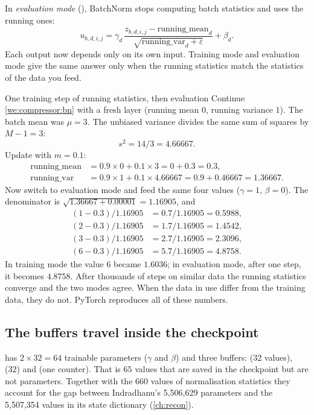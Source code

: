 In \emph{evaluation mode} (), BatchNorm stops computing batch statistics and uses the
running ones:
\begin{equation}\label{eq:compressor:bneval}
u_{b,d,i,j} = \gamma_d\,\frac{z_{b,d,i,j} - \text{running\_mean}_d}{\sqrt{\text{running\_var}_d + \varepsilon}} + \beta_d .
\end{equation}
Each output now depends only on its own input. Training mode and evaluation mode give the same answer
only when the running statistics match the statistics of the data you feed.

\begin{worked}[label={we:compressor:bneval}]{One training step of running statistics, then evaluation}
Continue \cref{we:compressor:bn} with a fresh layer (running mean $0$, running variance $1$). The batch
mean was $\mu = 3$. The unbiased variance divides the same sum of squares by $M-1 = 3$:
\[
s^2 = 14/3 = 4.66667.
\]
Update with $m = 0.1$:
\begin{align*}
\text{running\_mean} &= 0.9\times0 + 0.1\times3 = 0 + 0.3 = 0.3,\\
\text{running\_var} &= 0.9\times1 + 0.1\times4.66667 = 0.9 + 0.46667 = 1.36667.
\end{align*}
Now switch to evaluation mode and feed the same four values ($\gamma=1$, $\beta=0$). The denominator is
$\sqrt{1.36667 + 0.00001} = 1.16905$, and
\begin{align*}
(1 - 0.3)/1.16905 &= 0.7/1.16905 = 0.5988,\\
(2 - 0.3)/1.16905 &= 1.7/1.16905 = 1.4542,\\
(3 - 0.3)/1.16905 &= 2.7/1.16905 = 2.3096,\\
(6 - 0.3)/1.16905 &= 5.7/1.16905 = 4.8758.
\end{align*}
In training mode the value $6$ became $1.6036$; in evaluation mode, after one step, it becomes $4.8758$.
After thousands of steps on similar data the running statistics converge and the two modes agree. When
the data in use differ from the training data, they do not. PyTorch reproduces all of these
numbers\tagC.
\end{worked}

\subsection{The buffers travel inside the checkpoint}

 has $2\times32 = 64$ trainable parameters ($\gamma$ and $\beta$) and three
buffers:  (32 values),  (32) and  (one
counter)\tagC. That is $65$ values that are saved in the checkpoint but are not parameters. Together
with the $660$ values of normalisation statistics they account for the gap between Indradhanu's
5{,}506{,}629 parameters and the 5{,}507{,}354 values in its state dictionary (\cref{ch:recon}).

